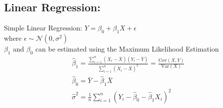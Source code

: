 \subsection{Linear Regression:}
Simple Linear Regression: $Y = \beta_0 + \beta_1 X + \epsilon$\\
where $\epsilon \sim \mathcal{N}(0, \sigma^2)$\\
$\beta_1$ and $\beta_0$ can be estimated using the Maximum Likelihood Estimation\\
\[
\begin{array}{ll}
    \hat{\beta}_1 = \frac{\sum_{i=1}^{n} (X_i - \bar{X})(Y_i - \bar{Y})}{\sum_{i=1}^{n} (X_i - \bar{X})^2} = \frac{\text{Cov}(X, Y)}{\text{Var}(X)}\\
    \hat{\beta}_0 = \bar{Y} - \hat{\beta}_1 \bar{X} \\
    \hat{\sigma}^2 = \frac{1}{n} \sum_{i=1}^{n} (Y_i - \hat{\beta}_0 - \hat{\beta}_1 X_i)^2
\end{array}
\]
